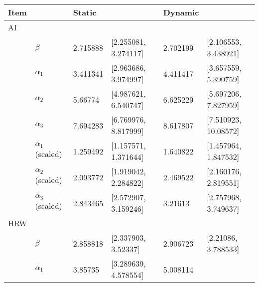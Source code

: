 \documentclass[12pt,letterpaper,leqno]{article}\usepackage[]{graphicx}\usepackage[]{color}
\begin{document}
\begin{table}[!h]
\begin{tabular}{p{.5cm}p{2cm}p{1.5cm}p{4cm}p{1.5cm}p{4cm}}
\hline
Item &  & Static  & & Dynamic  & \\
\hline 
AI & & & & & \\ 
 & $\beta$               & 2.715888 
                         & [2.255081, 
                         3.274117] 
                         & 2.702199 
                         & [2.106553, 
                         3.438921]\\
 & $\alpha_{1}$          & 3.411341 
                         & [2.963686, 
                         3.974997]
                         & 4.411417 
                         & [3.657559, 
                         5.390759]\\
 & $\alpha_{2}$          & 5.66774 
                         & [4.987621, 
                         6.540747]
                         & 6.625229 
                         & [5.697206, 
                         7.827959]\\
 & $\alpha_{3}$          & 7.694283 
                         & [6.769976, 
                         8.817999]
                         & 8.617807 
                         & [7.510923, 
                         10.08572]\\
 & $\alpha_{1}$ (scaled) & 1.259492 
                         & [1.157571, 
                         1.371644]
                         & 1.640822 
                         & [1.457964, 
                         1.847532]\\
 & $\alpha_{2}$ (scaled) & 2.093772 
                         & [1.919042, 
                         2.284822]
                         & 2.469522 
                         & [2.160176, 
                         2.819551]\\
 & $\alpha_{3}$ (scaled) & 2.843465 
                         & [2.572907, 
                         3.159246]
                         & 3.21613 
                         & [2.757968, 
                         3.749637]\\
HRW & & & & & \\ 
 & $\beta$               & 2.858818 
                         & [2.337903, 
                         3.52337] 
                         & 2.906723 
                         & [2.21086, 
                         3.788533]\\
 & $\alpha_{1}$          & 3.85735 
                         & [3.289639, 
                         4.578554]
                         & 5.008114 

\end{tabular}
\end{table}
\end{document}
